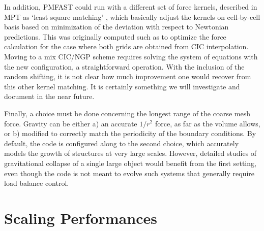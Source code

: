 \documentclass[useAMS,usenatbib]{mn2e}
\begin{document}
In addition, {\small PMFAST} could run with a different set of force kernels, described in MPT as  `least square matching' , 
which basically adjust the kernels on cell-by-cell basis based on minimization of the deviation with respect
to Newtonian predictions. This was originally computed such as to optimize the force calculation for
the case where both grids are obtained from CIC interpolation. Moving to a mix CIC/NGP scheme
requires solving the system of equations with the new configuration, a straightforward operation.
 With the inclusion of the random shifting, it is not clear how much improvement 
one would recover from this other kernel matching.  It is certainly something
we will investigate and document in the near future.


Finally, a choice must be done concerning the longest range of the coarse mesh force. Gravity can be either a) an accurate $1/r^2$ force, as far as the volume allows, 
or b) modified to correctly match the periodicity of the boundary conditions. By default, the code is configured along to the second choice,
which accurately models the growth of structures at very large scales. However, detailed studies of gravitational collapse of a single large object would benefit 
from the first setting, even though the code is not meant to evolve such systems that generally require load balance control.


%

\section{Scaling Performances}
\label{sec:scaling}
\end{document}
